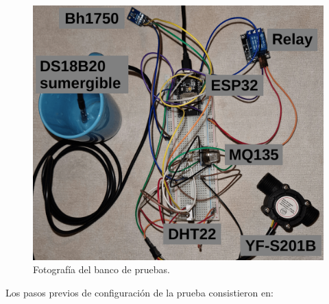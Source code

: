 \begin{figure}[H]
	\centering
	\includegraphics[width=.9\textwidth]{./Figures/Banco de pruebas.png}
	\caption{Fotografía del banco de pruebas.}
	\label{fig:fotografiaBancoDePruebas}
\end{figure}


Los pasos previos de configuración de la prueba consistieron en:

